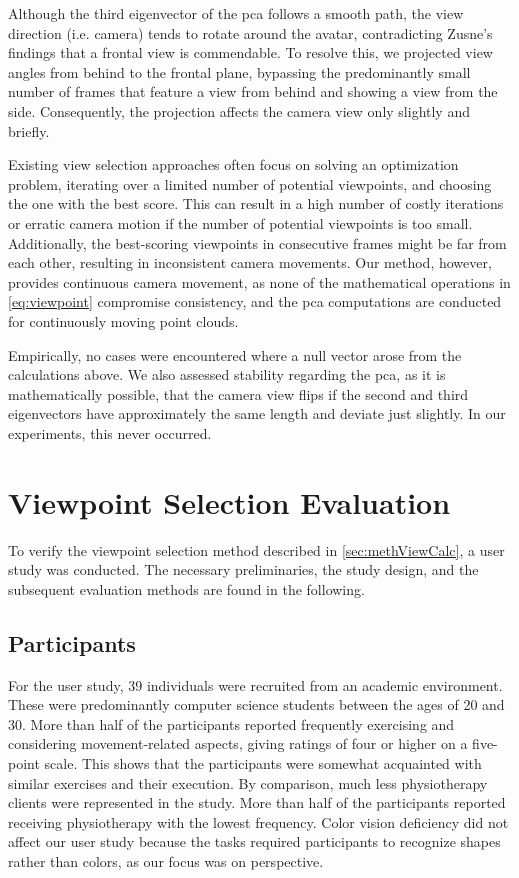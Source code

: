Although the third eigenvector of the \acrshort{pca} follows a smooth path, the view direction (i.e. camera) tends to rotate around the avatar, contradicting Zusne's~\cite{zusne1970vpf} findings that a frontal view is commendable. To resolve this, we projected view angles from behind to the frontal plane, bypassing the predominantly small number of frames that feature a view from behind and showing a view from the side. Consequently, the projection affects the camera view only slightly and briefly.

Existing view selection approaches often focus on solving an optimization problem, iterating over a limited number of potential viewpoints, and choosing the one with the best score. This can result in a high number of costly iterations or erratic camera motion if the number of potential viewpoints is too small. Additionally, the best-scoring viewpoints in consecutive frames might be far from each other, resulting in inconsistent camera movements. Our method, however, provides continuous camera movement, as none of the mathematical operations in \autoref{eq:viewpoint} compromise consistency, and the \acrshort{pca} computations are conducted for continuously moving point clouds.

Empirically, no cases were encountered where a null vector arose from the calculations above. We also assessed stability regarding the \acrshort{pca}, as it is mathematically possible, that the camera view flips if the second and third eigenvectors have approximately the same length and deviate just slightly. In our experiments, this never occurred.

\section{Viewpoint Selection Evaluation \label{sec:evaluation}}
To verify the viewpoint selection method described in \autoref{sec:methViewCalc}, a user study was conducted. The necessary preliminaries, the study design, and the subsequent evaluation methods are found in the following.

\subsection{Participants}
For the user study, 39 individuals were recruited from an academic environment. These were predominantly computer science students between the ages of 20 and 30. More than half of the participants reported frequently exercising and considering movement-related aspects, giving ratings of four or higher on a five-point scale. This shows that the participants were somewhat acquainted with similar exercises and their execution. By comparison, much less physiotherapy clients were represented in the study. More than half of the participants reported receiving physiotherapy with the lowest frequency. Color vision deficiency did not affect our user study because the tasks required participants to recognize shapes rather than colors, as our focus was on perspective.

